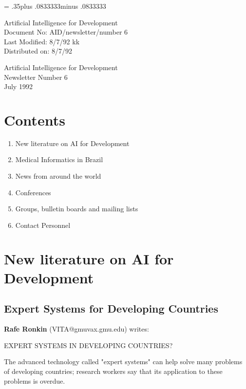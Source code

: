 \pagestyle{myheadings}
\setlength{\textheight}{8.5in}
\setlength{\topmargin}{0in}
\setlength{\headheight}{.3in}
\setlength{\headsep}{.5in}
\parindent=0pt
\parskip= .35\baselineskip plus .0833333\baselineskip minus .0833333\baselineskip

Artificial Intelligence for Development\\
Document No: AID/newsletter/number 6\\
Last Modified: 8/7/92 kk\\
Distributed on: 8/7/92\\
\LARGE
\begin{center} Artificial Intelligence for Development\\
Newsletter Number 6\\July 1992\\

\end{center}
\normalsize
\section*{Contents}
\begin{enumerate}
\item New literature on AI for Development
\item Medical Informatics in Brazil
\item News from around the world
\item Conferences
\item Groups, bulletin boards and mailing lists
\item Contact Personnel
\end{enumerate}

\section{New literature on AI for Development}
\subsection{Expert Systems for Developing Countries}

{\bf Rafe Ronkin} (VITA@gmuvax.gmu.edu) writes:

EXPERT SYSTEMS IN DEVELOPING COUNTRIES?

The advanced technology called "expert systems" can help solve many
problems of developing countries; research workers say that its
application to these problems is overdue. 

